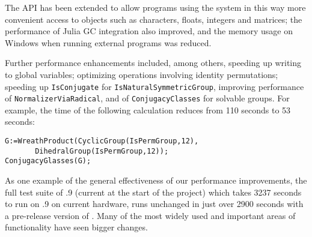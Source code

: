 The  API has been extended
to allow programs using the system in this way
more convenient access to \GAP objects such as
characters, floats, integers
and matrices; 
the performance of Julia GC integration also improved,
and the memory usage on Windows when running external programs was reduced.

Further performance enhancements included, among others,
speeding up writing to global variables;
optimizing operations involving identity permutations;
speeding up \verb|IsConjugate| for \verb|IsNaturalSymmetricGroup|,
improving performance of \verb|NormalizerViaRadical|,
and of \verb|ConjugacyClasses| for solvable groups. For example, the time
of the following calculation reduces from 110 seconds to 53 seconds:

{\Small
\begin{verbatim}
G:=WreathProduct(CyclicGroup(IsPermGroup,12),
       DihedralGroup(IsPermGroup,12));
ConjugacyGlasses(G);
\end{verbatim}
}
\noindent

%
%
%



As one example of the general effectiveness of our performance
improvements, the full test suite of .9 (current at the
start of the project) which takes 3237 seconds to run on .9 on
current hardware, runs unchanged in just over 2900 seconds with a
pre-release version of . Many of the most widely used and
important areas of \GAP functionality have seen bigger changes.  

